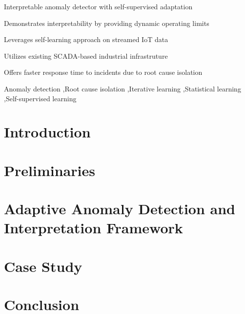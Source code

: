 \documentclass[preprint,12pt,authoryear]{elsarticle}
\begin{document}
\begin{frontmatter}
\begin{highlights}
\item Interpretable anomaly detector with self-supervised adaptation
\item Demonstrates interpretability by providing dynamic operating limits
\item Leverages self-learning approach on streamed IoT data
\item Utilizes existing SCADA-based industrial infrastruture
\item Offers faster response time to incidents due to root cause isolation
\end{highlights}

\begin{keyword}
Anomaly detection \sep Root cause isolation \sep Iterative learning \sep Statistical learning \sep Self-supervised learning
\end{keyword}

\end{frontmatter}

\linenumbers

\section{Introduction}
\label{Introduction}


\section{Preliminaries}
\label{Preliminaries}


\clearpage
\section{Adaptive Anomaly Detection and Interpretation Framework}
\label{Proposed Method}


\clearpage
\section{Case Study}
\label{Case Study}


\section{Conclusion}
\label{Conclusion}

\end{document}
